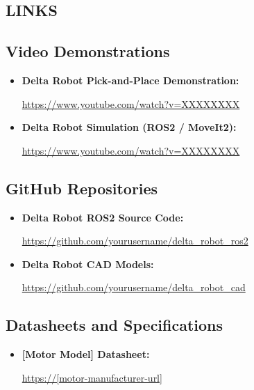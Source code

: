 \begin{appendices}
\renewcommand{\appendixname}{APPENDIX}
\section{\centering LINKS}

\subsection*{Video Demonstrations}
\begin{itemize}
    \item \textbf{Delta Robot Pick-and-Place Demonstration:}\par
    \label{link:demo_video}
    \url{https://www.youtube.com/watch?v=XXXXXXXX}

    \item \textbf{Delta Robot Simulation (ROS2 / MoveIt2):}\par
    \label{link:simulation_video}
    \url{https://www.youtube.com/watch?v=XXXXXXXX}
\end{itemize}

\subsection*{GitHub Repositories}
\begin{itemize}
    \item \textbf{Delta Robot ROS2 Source Code:}\par
    \label{link:github_ros2}
    \url{https://github.com/yourusername/delta_robot_ros2}

    \item \textbf{Delta Robot CAD Models:}\par
    \label{link:github_cad}
    \url{https://github.com/yourusername/delta_robot_cad}
\end{itemize}

\subsection*{Datasheets and Specifications}
\begin{itemize}
    \item \textbf{[Motor Model] Datasheet:}\par
    \label{link:motor_datasheet}
    \url{https://[motor-manufacturer-url]}


\end{itemize}
\end{appendices}
